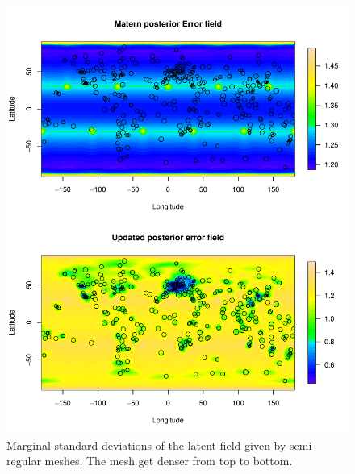 \documentclass[a4paper,12pt]{article}
\begin{document}
\begin{figure}[htbp]
 \begin{center}
 \includegraphics[scale=0.8]{fig/reg_sMeshGIA_error_field.pdf}
 \end{center}
 \caption[Semi-regular mesh]{Marginal standard deviations of the latent field given by semi-regular meshes. The mesh get denser from top to bottom.}
 \label{fig:mesh_comp_hyper}
 \end{figure}
\end{document}
